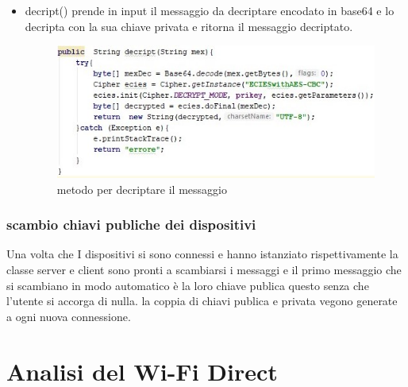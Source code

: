 \begin{itemize}
    \item decript() prende in input il messaggio da decriptare encodato in base64 
    e lo decripta con
    la sua chiave privata e ritorna il messaggio decriptato.
    \begin{figure}
        \caption{metodo per decriptare il messaggio}
        \includegraphics[width=1  \columnwidth]{imgs/decript.jpg}
    \end{figure}



\end{itemize} 

\subsubsection{scambio chiavi publiche dei dispositivi} 
Una volta che I dispositivi si sono connessi e hanno istanziato
rispettivamente la classe server e client sono pronti a scambiarsi i messaggi
e il primo messaggio che si scambiano in modo automatico è la loro chiave publica
questo senza che l'utente si accorga di nulla.
la coppia di chiavi publica e privata vegono generate a ogni nuova connessione.


\section{Analisi del Wi-Fi Direct}

